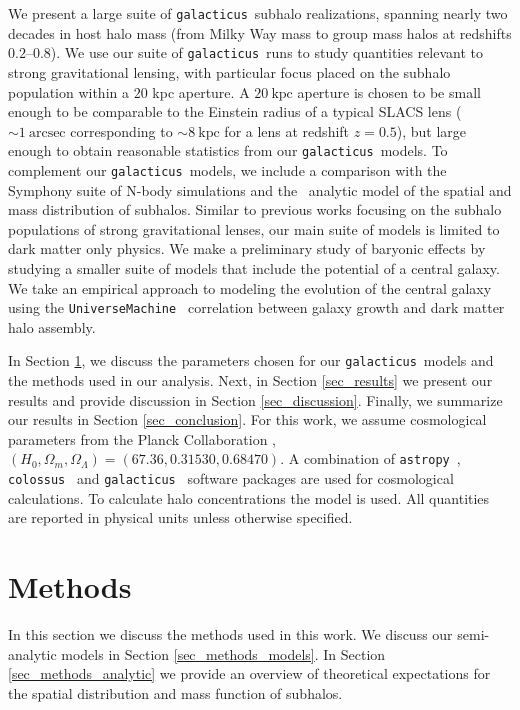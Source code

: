 \documentclass[%
 reprint,
 amsmath,
 amssymb,
 aps,
prd,
twocolumn,
superscriptaddress,
preprintnumbers,
floatfix,
nofootinbib
]{revtex4-2}
\def\gal{{\tt galacticus}~}
\def\symphony{Symphony }
\def\col{{\tt colossus}~}
\def\astropy{{\tt astropy}~}
\def\hanetal{\citet{10.1093/mnras/stv2900}~}
\newcommand{\refsec}[1]{Section \ref{#1}}
\begin{document}
We present a large suite of \gal subhalo realizations, spanning nearly two decades in host halo mass (from Milky Way mass to group mass halos at redshifts $0.2$--$0.8$).
We use our suite of \gal runs to study quantities relevant to strong gravitational lensing, with particular focus placed on the subhalo population within a $20$ kpc aperture.
A $20 ~\text{kpc}$ aperture is chosen to be small enough to be comparable to the Einstein radius of a typical SLACS lens \citep{shu2017sloan} ($\sim 1 ~\text{arcsec}$ corresponding to $\sim 8 ~\text{kpc}$ for a lens at redshift $z = 0.5$), but large enough to obtain reasonable statistics from our \gal models.
To complement our \gal models, we include a comparison with the \symphony suite of N-body simulations and the \hanetal analytic model of the spatial and mass distribution of subhalos.  
Similar to previous works focusing on the subhalo populations of strong gravitational lenses, our main suite of models is limited to dark matter only physics.
We make a preliminary study of baryonic effects by studying a smaller suite of models that include the potential of a central galaxy.
We take an empirical approach to modeling the evolution of the central galaxy using the {\tt UniverseMachine } \citep{Behroozi_2019} correlation between galaxy growth and dark matter halo assembly. 




In \refsec{sec_methods}, we discuss the parameters chosen for our \gal models and the methods used in our analysis.
Next, in \refsec{sec_results} we present our results and provide discussion in \refsec{sec_discussion}.
Finally, we summarize our results in \refsec{sec_conclusion}.
For this work, we assume cosmological parameters from the Planck Collaboration \citep{2020}, $(H_0, \Omega_m, \Omega_\Lambda) = (67.36, 0.31530, 0.68470)$.
A combination of \astropy \citep{astropy:2013,astropy:2018,astropy:2022}, \col \citep{diemer2018colossus} and \gal \citep{BENSON2012175} software packages are used for cosmological calculations.
To calculate halo concentrations the \citet{diemer2019accurate} model is used.
All quantities are reported in physical units unless otherwise specified.

\section{Methods}\label{sec_methods}
In this section we discuss the methods used in this work.
We discuss our semi-analytic models in \refsec{sec_methods_models}.
In \refsec{sec_methods_analytic} we provide an overview of theoretical expectations for the spatial distribution and mass function of subhalos.
\end{document}
